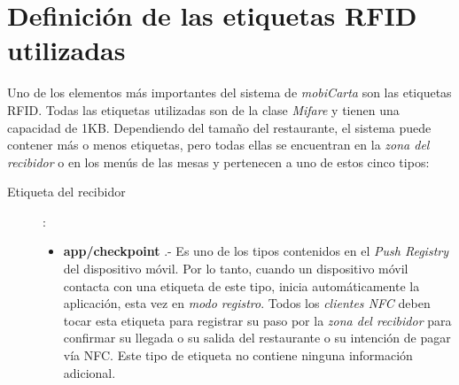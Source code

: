 \chapter{Definición de las etiquetas \acs{RFID} utilizadas}
\label{chap:tags}
Uno de los elementos más importantes del sistema de \emph{mobiCarta} son las etiquetas \acs{RFID}. Todas las etiquetas utilizadas son de la clase
\emph{Mifare} y tienen una capacidad de 1KB. Dependiendo del tamaño del
restaurante, el sistema puede contener más o menos etiquetas, pero todas ellas
se encuentran en la \emph{zona del recibidor} o en los menús de las mesas y 
pertenecen a uno de estos cinco tipos:
\begin{description}
\item[Etiqueta del recibidor]:
  \begin{itemize}
  \item \textbf{app/checkpoint} .- Es uno de los tipos contenidos en el
  \emph{Push Registry} del dispositivo móvil. Por lo tanto, cuando un
  dispositivo móvil contacta con una etiqueta de este tipo, inicia 
  automáticamente la aplicación, esta vez en \emph{modo registro}. Todos los 
  \emph{clientes \acs{NFC}} deben tocar esta etiqueta para registrar su paso
  por la \emph{zona del recibidor} para confirmar su llegada o su salida del 
  restaurante o su intención de pagar vía \acs{NFC}. Este tipo de etiqueta no 
  contiene ninguna información adicional.
  \end{itemize}


\end{description}
